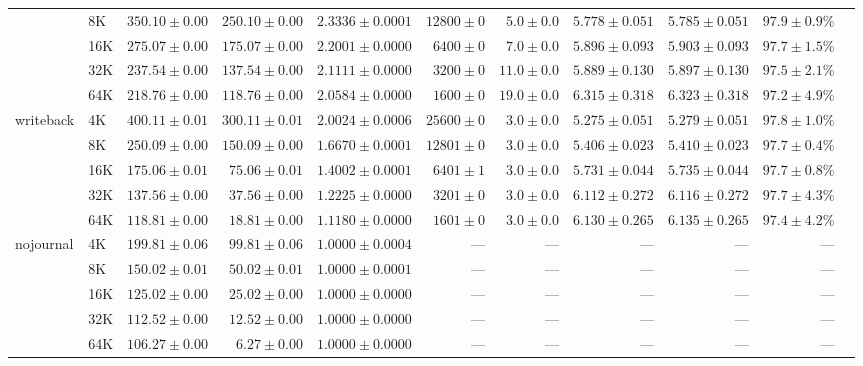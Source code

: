 \documentclass[12pt,a4paper]{article}
\begin{document}
\begin{table}[H]
{\begin{tabular}{llrrrrrrrrr}
  & 8K  & $350.10 \pm 0.00$ & $250.10 \pm 0.00$ & $2.3336 \pm 0.0001$ & $12800 \pm 0$ & $ 5.0 \pm 0.0$ & $5.778 \pm 0.051$ & $5.785 \pm 0.051$ & $97.9 \pm 0.9$\% \\
  & 16K & $275.07 \pm 0.00$ & $175.07 \pm 0.00$ & $2.2001 \pm 0.0000$ & $ 6400 \pm 0$ & $ 7.0 \pm 0.0$ & $5.896 \pm 0.093$ & $5.903 \pm 0.093$ & $97.7 \pm 1.5$\% \\
  & 32K & $237.54 \pm 0.00$ & $137.54 \pm 0.00$ & $2.1111 \pm 0.0000$ & $ 3200 \pm 0$ & $11.0 \pm 0.0$ & $5.889 \pm 0.130$ & $5.897 \pm 0.130$ & $97.5 \pm 2.1$\% \\
  & 64K & $218.76 \pm 0.00$ & $118.76 \pm 0.00$ & $2.0584 \pm 0.0000$ & $ 1600 \pm 0$ & $19.0 \pm 0.0$ & $6.315 \pm 0.318$ & $6.323 \pm 0.318$ & $97.2 \pm 4.9$\% \\
\midrule
\multirow{5}{*}{writeback}
  & 4K  & $400.11 \pm 0.01$ & $300.11 \pm 0.01$ & $2.0024 \pm 0.0006$ & $25600 \pm 0$ & $3.0 \pm 0.0$ & $5.275 \pm 0.051$ & $5.279 \pm 0.051$ & $97.8 \pm 1.0$\% \\
  & 8K  & $250.09 \pm 0.00$ & $150.09 \pm 0.00$ & $1.6670 \pm 0.0001$ & $12801 \pm 0$ & $3.0 \pm 0.0$ & $5.406 \pm 0.023$ & $5.410 \pm 0.023$ & $97.7 \pm 0.4$\% \\
  & 16K & $175.06 \pm 0.01$ & $ 75.06 \pm 0.01$ & $1.4002 \pm 0.0001$ & $ 6401 \pm 1$ & $3.0 \pm 0.0$ & $5.731 \pm 0.044$ & $5.735 \pm 0.044$ & $97.7 \pm 0.8$\% \\
  & 32K & $137.56 \pm 0.00$ & $ 37.56 \pm 0.00$ & $1.2225 \pm 0.0000$ & $ 3201 \pm 0$ & $3.0 \pm 0.0$ & $6.112 \pm 0.272$ & $6.116 \pm 0.272$ & $97.7 \pm 4.3$\% \\
  & 64K & $118.81 \pm 0.00$ & $  18.81 \pm 0.00$ & $1.1180 \pm 0.0000$ & $ 1601 \pm 0$ & $3.0 \pm 0.0$ & $6.130 \pm 0.265$ & $6.135 \pm 0.265$ & $97.4 \pm 4.2$\% \\
\midrule
\multirow{5}{*}{nojournal}
  & 4K  & $199.81 \pm 0.06$ & $ 99.81 \pm 0.06$ & $1.0000 \pm 0.0004$ & --- & --- & --- & --- & --- \\
  & 8K  & $150.02 \pm 0.01$ & $ 50.02 \pm 0.01$ & $1.0000 \pm 0.0001$ & --- & --- & --- & --- & --- \\
  & 16K & $125.02 \pm 0.00$ & $ 25.02 \pm 0.00$ & $1.0000 \pm 0.0000$ & --- & --- & --- & --- & --- \\
  & 32K & $112.52 \pm 0.00$ & $ 12.52 \pm 0.00$ & $1.0000 \pm 0.0000$ & --- & --- & --- & --- & --- \\
  & 64K & $106.27 \pm 0.00$ & $  6.27 \pm 0.00$ & $1.0000 \pm 0.0000$ & --- & --- & --- & --- & --- \\
\bottomrule
\end{tabular}%
}
\end{table}
\end{document}
